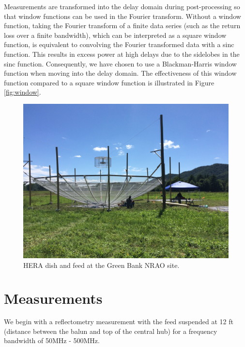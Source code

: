 \documentclass[12pt,preprint]{aastex}
\begin{document}
Measurements are transformed into the delay domain during post-processing so that window functions
can be used in the Fourier transform. Without a window function, taking the Fourier transform of a finite data series (such as the return loss over a finite bandwidth), which can be interpreted as a square window function, is equivalent to convolving the Fourier transformed data with a sinc function. This results in excess power at high delays due to the sidelobes in the sinc function. Consequently, we have chosen to use a Blackman-Harris window function when moving into the delay domain. The effectiveness of this window function compared to a square window function is illustrated in Figure \ref{fig:window}.

\begin{figure}
\centering
\includegraphics[trim={2cm 20cm 30cm 15cm},clip, totalheight=0.45\textheight]{plots/heradish.jpg}
\caption{HERA dish and feed at the Green Bank NRAO site.}
\label{fig:heradish}
\end{figure}


\section{Measurements}

We begin with a reflectometry measurement with the feed suspended at 12 ft (distance between the balun and top of the central hub) for a frequency bandwidth of 50MHz - 500MHz.
\end{document}
